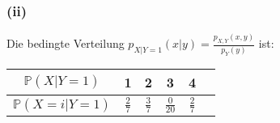\documentclass[a4paper,10pt]{article}
\newcommand{\wk}[1]{\ensuremath{\mathbb{P}(#1)}}
\begin{document}
\subsubsection{(ii)}
Die bedingte Verteilung $p_{X|Y=1}(x|y) = \frac{p_{X,Y}(x,y)}{p_Y(y)}$ ist:\\
\begin{center}
  \begin{tabular}{ c || c | c | c | c | c}
    $\wk{X|Y=1}$ & 1              & 2              & 3               & 4  &  \\ \hline
    $\wk{X=i|Y=1}$  & $\frac{2}{7}$ & $\frac{3}{7}$ & $\frac{0}{20}$  & $\frac{2}{7}$ \\
  \end{tabular}
\end{center}
\end{document}
